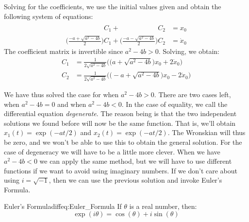\begin{bproof}
\begin{equation*}
                \end{equation*}
                Solving for the coefficients, we use the initial
                values given and obtain the following system of
                equations:
                \begin{align*}
                    \phantom{\Big(\frac{-a+\sqrt{a^{2}-4b}}{2}\Big)}
                    C_{1}+
                    \phantom{\Big(\frac{-a+\sqrt{a^{2}-4b}}{2}\Big)}
                    C_{2}&=x_{0}\\
                    \Big(\frac{-a+\sqrt{a^{2}-4b}}{2}\Big)C_{1}+
                    \Big(\frac{-a-\sqrt{a^{2}-4b}}{2}\Big)C_{2}
                    &=\dot{x}_{0}
                \end{align*}
                The coefficient matrix is invertible
                since $a^{2}-4b>0$. Solving, we obtain:
                \begin{align*}
                    C_{1}&=
                    \frac{1}{2\sqrt{a^{2}-4b}}\Big(
                    \big(a+\sqrt{a^{2}-4b}\big)x_{0}+
                    2\dot{x}_{0}\Big)\\
                    C_{2}&=
                    \frac{1}{2\sqrt{a^{2}-4b}}\Big(
                    \big(-a+\sqrt{a^{2}-4b}\big)x_{0}-
                    2\dot{x}_{0}\Big)
                \end{align*}
            \end{bproof}
            We have thus solved the case for when $a^{2}-4b>0$.
            There are two cases left, when $a^{2}-4b=0$ and when
            $a^{2}-4b<0$. In the case of equality, we call the
            differential equation \textit{degenerate}. The reason
            being is that the two independent solutions we found
            before will now be the same function. That is,
            we'll obtain $x_{1}(t)=\exp(-at/2)$ and
            $x_{2}(t)=\exp(-at/2)$. The Wronskian will thus be
            zero, and we won't be able to use this to obtain
            the general solution. For the case of degeneracy
            we will have to be a little more clever. When we have
            $a^{2}-4b<0$ we can apply the same method, but we
            will have to use different functions if we want to
            avoid using imaginary numbers. If we don't care about
            using $i=\sqrt{-1}$, then we can use the previous
            solution and invoke Euler's Formula.
            \begin{ftheorem}{Euler's Formula}{diffeq:Euler_Formula}
                If $\theta$ is a real number, then:
                \begin{equation*}
                    \exp(i\theta)=\cos(\theta)+i\sin(\theta)
                \end{equation*}
            \end{ftheorem}

